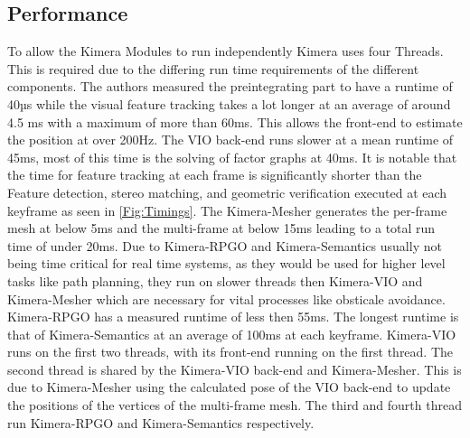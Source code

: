 \documentclass[11pt,a4paper]{article}
\begin{document}
\subsection{Performance}
To allow the Kimera Modules to run independently Kimera uses four Threads. This is required due to the differing run time requirements of the different components.
The authors measured the preintegrating part to have a runtime of 40µs while the visual feature tracking takes a lot longer at an average of around 4.5 ms with a maximum of more than 60ms.
This allows the front-end to estimate the position at over 200Hz.
The VIO back-end runs slower at a mean runtime of 45ms, most of this time is the solving of factor graphs at 40ms. 
It is notable that the time for feature tracking at each frame is significantly shorter than the Feature detection, stereo matching,
and geometric verification executed at each keyframe as seen in \ref{Fig:Timings}.
The Kimera-Mesher generates the per-frame mesh at below 5ms and the multi-frame at below 15ms leading to a total run time of under 20ms.
Due to Kimera-RPGO and Kimera-Semantics usually not being time critical for real time systems, as they would be used for higher level tasks like path planning, they run on slower threads then Kimera-VIO and Kimera-Mesher which are necessary for vital processes like obsticale avoidance.
Kimera-RPGO has a measured runtime of less then 55ms.
The longest runtime is that of Kimera-Semantics at an average of 100ms at each keyframe. 
Kimera-VIO runs on the first two threads, with its front-end running on the first thread.
The second thread is shared by the Kimera-VIO back-end and Kimera-Mesher.
This is due to Kimera-Mesher using the calculated pose of the VIO back-end to update the positions of the vertices of the multi-frame mesh.
The third and fourth thread run Kimera-RPGO and Kimera-Semantics respectively. 
\end{document}
